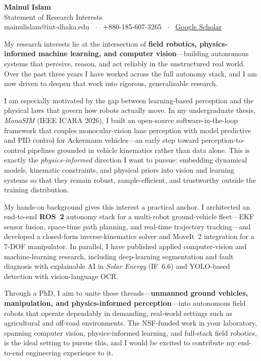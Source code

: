 \documentclass[11pt]{article}
\begin{document}
\begin{center}
    {\LARGE \textbf{Mainul Islam}}\\[3pt]
    {\normalsize Statement of Research Interests}\\[2pt]
    {\small mainulislam@iut-dhaka.edu \ $\cdot$ \ +880-185-607-3265 \ $\cdot$ \
    \href{https://scholar.google.com/citations?user=mHfGHugAAAAJ&hl=en}{Google Scholar}}
\end{center}

\vspace{4pt}

My research interests lie at the intersection of \textbf{field robotics, physics-informed
machine learning, and computer vision}---building autonomous systems that perceive, reason,
and act reliably in the unstructured real world. Over the past three years I have worked across
the full autonomy stack, and I am now driven to deepen that work into rigorous, generalizable
research.

I am especially motivated by the gap between learning-based perception and the physical laws
that govern how robots actually move. In my undergraduate thesis, \textit{MonoSIM} (IEEE ICARA
2026), I built an open-source software-in-the-loop framework that couples monocular-vision lane
perception with model predictive and PID control for Ackermann vehicles---an early step toward
perception-to-control pipelines grounded in vehicle kinematics rather than data alone. This is
exactly the \emph{physics-informed} direction I want to pursue: embedding dynamical models,
kinematic constraints, and physical priors into vision and learning systems so that they remain
robust, sample-efficient, and trustworthy outside the training distribution.

My hands-on background gives this interest a practical anchor. I architected an end-to-end
\textbf{ROS~2} autonomy stack for a multi-robot ground-vehicle fleet---EKF sensor fusion,
space-time path planning, and real-time trajectory tracking---and developed a closed-form
inverse-kinematics solver and MoveIt~2 integration for a 7-DOF manipulator. In parallel, I have
published applied computer-vision and machine-learning research, including deep-learning
segmentation and fault diagnosis with explainable AI in \textit{Solar Energy} (IF~6.6) and
YOLO-based detection with vision-language OCR.

Through a PhD, I aim to unite these threads---\textbf{unmanned ground vehicles, manipulation,
and physics-informed perception}---into autonomous field robots that operate dependably in
demanding, real-world settings such as agricultural and off-road environments. The NSF-funded
work in your laboratory, spanning computer vision, physics-informed learning, and full-stack
field robotics, is the ideal setting to pursue this, and I would be excited to contribute my
end-to-end engineering experience to it.
\end{document}
